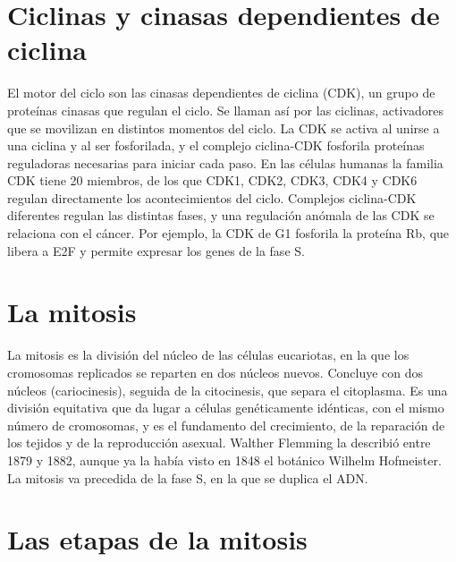 \documentclass{book}
\begin{document}

\section{Ciclinas y cinasas dependientes de ciclina}

El motor del ciclo son las cinasas dependientes de ciclina (CDK), un grupo de proteínas cinasas que regulan el ciclo. Se llaman así por las ciclinas, activadores que se movilizan en distintos momentos del ciclo. La CDK se activa al unirse a una ciclina y al ser fosforilada, y el complejo ciclina-CDK fosforila proteínas reguladoras necesarias para iniciar cada paso. En las células humanas la familia CDK tiene 20 miembros, de los que CDK1, CDK2, CDK3, CDK4 y CDK6 regulan directamente los acontecimientos del ciclo. Complejos ciclina-CDK diferentes regulan las distintas fases, y una regulación anómala de las CDK se relaciona con el cáncer. Por ejemplo, la CDK de G1 fosforila la proteína Rb, que libera a E2F y permite expresar los genes de la fase S.


\section{La mitosis}

La mitosis es la división del núcleo de las células eucariotas, en la que los cromosomas replicados se reparten en dos núcleos nuevos. Concluye con dos núcleos (cariocinesis), seguida de la citocinesis, que separa el citoplasma. Es una división equitativa que da lugar a células genéticamente idénticas, con el mismo número de cromosomas, y es el fundamento del crecimiento, de la reparación de los tejidos y de la reproducción asexual. Walther Flemming la describió entre 1879 y 1882, aunque ya la había visto en 1848 el botánico Wilhelm Hofmeister. La mitosis va precedida de la fase S, en la que se duplica el ADN.


\section{Las etapas de la mitosis}
\end{document}
